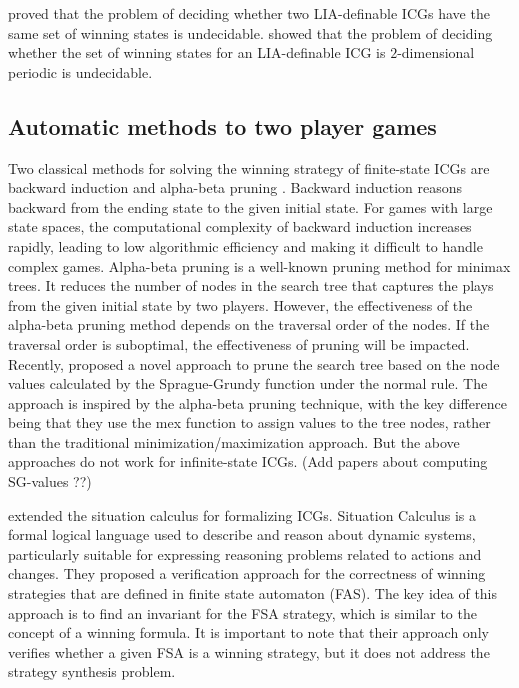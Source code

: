 \documentclass[review]{elsarticle}
\begin{document}
\citet{LarW2013} proved that the problem of deciding whether two LIA-definable ICGs have the same set of winning states is undecidable.	
\citet{Lar2013} showed that the problem of deciding whether the set of winning states for an LIA-definable ICG is $2$-dimensional periodic is undecidable.	


\subsection{Automatic methods to two player games}
Two classical methods for solving the winning strategy of finite-state ICGs are backward induction \cite{Wat2002} and alpha-beta pruning \cite{BelM2020,HeiPS2008}.
Backward induction reasons backward from the ending state to the given initial state. For games with large state spaces, the computational complexity of backward induction increases rapidly, leading to low algorithmic efficiency and making it difficult to handle complex games. 
Alpha-beta pruning is a well-known pruning method for minimax trees. It reduces the number of nodes in the search tree that captures the plays from the given initial state by two players. However, the effectiveness of the alpha-beta pruning method depends on the traversal order of the nodes. If the traversal order is suboptimal, the effectiveness of pruning will be impacted. Recently, \citet{BelM2020} proposed a novel approach to prune the search tree based on the node values calculated by the Sprague-Grundy function under the normal rule. The approach is inspired by the alpha-beta pruning technique, with the key difference being that they use the mex function to assign values to the tree nodes, rather than the traditional minimization/maximization approach. But the above approaches do not work for infinite-state ICGs.
(Add papers about computing SG-values ??)

\citet{LuoL2019} extended the situation calculus for formalizing ICGs.
Situation Calculus is a formal logical language used to describe and reason about dynamic systems, particularly suitable for expressing reasoning problems related to actions and changes.
They proposed a verification approach for the correctness of winning strategies that are defined in finite state automaton (FAS).
The key idea of this approach is to find an invariant for the FSA strategy, which is similar to the concept of a winning formula. It is important to note that their approach only verifies whether a given FSA is a winning strategy, but it does not address the strategy synthesis problem.
 
\end{document}
